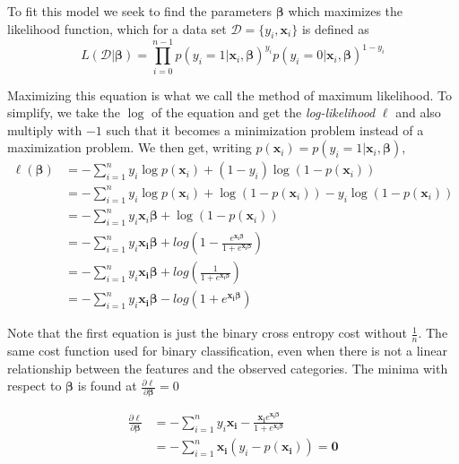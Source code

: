 \documentclass{article}
\theoremstyle{definition}
\begin{document}
To fit this model we seek to find the parameters $\boldsymbol{\beta}$ which maximizes the likelihood function, which for a data set $\mathcal{D} = \{y_i, \boldsymbol{x}_i\}$ is defined as
\begin{equation*}
    L\left( \mathcal{D} | \boldsymbol{\beta} \right) = \prod_{i = 0}^{n-1} p\left( y_i = 1 | \boldsymbol{x}_i, \boldsymbol{\beta} \right)^{y_i} p\left( y_i = 0 | \boldsymbol{x}_i, \boldsymbol{\beta} \right)^{1 - y_i}
\end{equation*}

Maximizing this equation is what we call the method of maximum likelihood. To simplify, we take the $\log$ of the equation and get the \textit{log-likelihood} $\ell$ and also multiply with $-1$ such that it becomes a minimization problem instead of a maximization problem. We then get, writing $p(\boldsymbol{x}_i) = p\left( y_i = 1 | \boldsymbol{x}_i, \boldsymbol{\beta} \right)$,
\begin{align*}
    \ell(\boldsymbol{\beta})
    &= -\sum_{i=1}^{n} y_i\log p(\boldsymbol{x}_i) + (1 - y_i)\log(1 - p(\boldsymbol{x}_i))  \label{eq:BCE_cost}\\
    &= -\sum_{i=1}^{n} y_i\log p(\boldsymbol{x}_i) + \log(1 - p(\boldsymbol{x}_i)) - y_i\log(1 - p(\boldsymbol{x}_i)) \\
    & = -\sum_{i=1}^{n} y_i\boldsymbol{x}_i\boldsymbol{\beta} + \log(1 - p(\boldsymbol{x}_i))\\
    & = - \sum_{i=1}^{n} y_i\boldsymbol{x_i} \boldsymbol{\beta} + log(1 - \frac{e^{\boldsymbol{x_i} \boldsymbol{\beta}}}{1 + e^{\boldsymbol{x_i \beta}}})\\
    & = - \sum_{i=1}^{n} y_i\boldsymbol{x_i} \boldsymbol{\beta} + log(\frac{1}{ 1 + e^{\boldsymbol{x_i \beta} }})\\
    & =  - \sum_{i=1}^{n} y_i\boldsymbol{x_i} \boldsymbol{\beta} - log(1 + e^{\boldsymbol{x_i \beta} })
\end{align*}

Note that the first equation is just the binary cross entropy cost without $\frac{1}{n}$. The same cost function used for binary classification, even when there is not a linear relationship between the features and the observed categories. The minima with respect to $\boldsymbol{\beta}$ is found at $\frac{\partial \ell }{\partial \boldsymbol{\beta}} = 0$ 

\begin{align*}
    \frac{\partial \ell }{\partial \boldsymbol{\beta}} &= - \sum_{i=1}^{n} y_i\boldsymbol{x_i}  - \frac{\boldsymbol{x_i} e^{\boldsymbol{x_i\beta}}}{1 + e^{\boldsymbol{x_i \beta} }}\\
    &= - \sum_{i=1}^{n}\boldsymbol{x_i} \left(y_i  -  p(\boldsymbol{x_i})\right) = \boldsymbol{0}
\end{align*}
\end{document}
